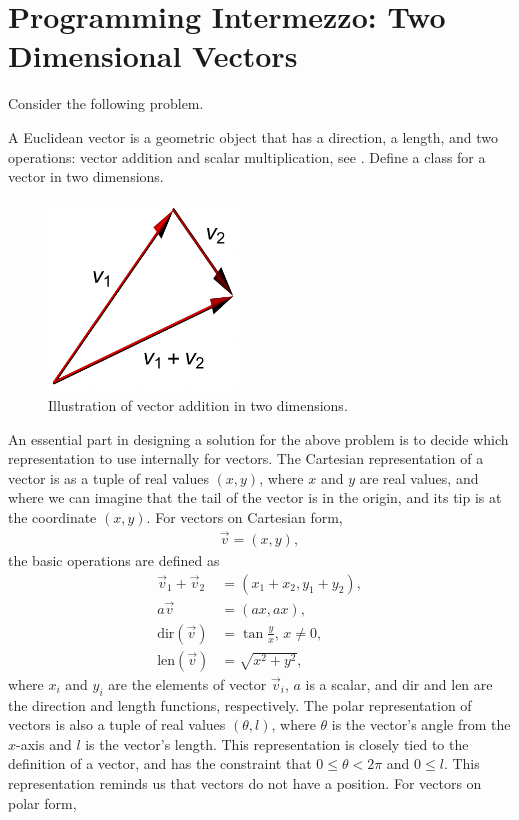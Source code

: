 \documentclass[fsharpNotes.tex]{subfiles}
\begin{document}
\section{Programming Intermezzo: Two Dimensional Vectors}
Consider the following problem.
\begin{task}
  A Euclidean vector is a geometric object that has a direction, a length, and two operations: vector addition and scalar multiplication, see . Define a class for a vector in two dimensions.
\end{task}
\begin{figure}
  \centering
  \includegraphics[width=0.45\textwidth]{vectorAddition}
  \caption{Illustration of vector addition in two dimensions.}
  \label{fig:vectorAddition}
\end{figure}
An essential part in designing a solution for the above problem is to decide which representation to use internally for vectors. The Cartesian representation of a vector is as a tuple of real values $(x,y)$, where $x$ and $y$ are real values, and where we can imagine that the tail of the vector is in the origin, and its tip is at the coordinate $(x,y)$. For vectors on Cartesian form,
\begin{align}
  \vec v = (x,y),
\end{align}
the basic operations are defined as
\begin{align}
  \vec v_1 + \vec v_2 &= (x_1+x_2, y_1+y_2),
  \\a\vec v &= (a x,a x),
  \\\text{dir}(\vec v) &= \tan\frac{y}{x},\, x\neq 0,
  \\\text{len}(\vec v) &= \sqrt{x^2+y^2},
\end{align}
where $x_i$ and $y_i$ are the elements of vector $\vec v_i$, $a$ is a scalar, and $\text{dir}$ and $\text{len}$ are the direction and length functions, respectively. The polar representation of vectors is also a tuple of real values $(\theta, l)$, where $\theta$ is the vector's angle from the $x$-axis and $l$ is the vector's length. This representation is closely tied to the definition of a vector, and has the constraint that $0 \leq \theta < 2\pi$ and $0 \leq l$. This representation reminds us that vectors do not have a position. For vectors on polar form,
\end{document}
